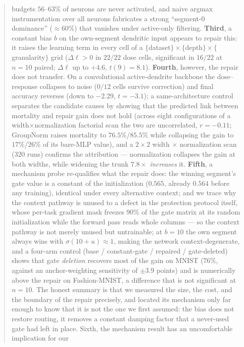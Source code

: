 \documentclass[review,12pt,number]{elsarticle}
\begin{document}
\begin{frontmatter}
\begin{abstract}
budgets $56$--$63\%$ of neurons are never activated, and naive argmax
instrumentation over all neurons fabricates a strong ``segment-0 dominance''
($\approx 60\%$) that vanishes under active-only filtering.
\textbf{Third}, a constant bias $b$ on the own-segment dendritic input appears
to repair this: it raises the learning term in every cell of a
$\{$dataset$\}\times\{$depth$\}\times\{$granularity$\}$ grid
($\Delta\ell>0$ in $22/22$ dose cells, significant in $16/22$ at $n{=}10$
paired; $\Delta\ell$ up to $+4.6$, $t(9){=}8.1$). \textbf{Fourth}, however, the
repair does not transfer. On a convolutional active-dendrite backbone the
dose--response collapses to noise ($0/12$ cells survive correction) and final accuracy
reverses (down to $-2.29$, $t{=}-3.1$); a same-architecture control separates
the candidate causes by showing that the predicted link between mortality and repair gain does not hold
(across eight configurations of a width$\times$normalization factorial scan the two are
uncorrelated, $r=-0.11$; GroupNorm raises mortality to $76.5\%$/$85.5\%$ while collapsing the gain to
$17\%$/$26\%$ of its bare-MLP value), and a $2\times 2$ width $\times$
normalization scan ($320$ runs) confirms the attribution --- normalization
collapses the gain at both widths, while widening the trunk $7.8\times$
\emph{increases} it. \textbf{Fifth}, a mechanism probe re-qualifies what the
repair does: the winning segment's gate value is a constant of the
initialization ($0.565$, already $0.564$ before any training), identical under
every alternative context; and we trace why the context pathway is unused to a
defect in the protection protocol itself, whose per-task gradient mask freezes
$90\%$ of the gate matrix at its random initialization while the forward pass
reads whole columns --- so the context pathway is not merely unused but
untrainable; at $b{=}10$ the own segment always wins with
$\sigma(10+u)\approx 1$, making the network context-degenerate, and a
four-arm control (base / constant-gate / repaired / gate-deleted) shows that
gate \emph{deletion} recovers most of the gain on MNIST ($76\%$, against an
anchor-weighting sensitivity of $\pm3.9$ points) and is numerically above the
repair on Fashion-MNIST, a difference that is not significant at $n{=}10$. The honest summary is that we measured the size, the cost, and
the boundary of the repair precisely, and located its mechanism only far enough
to know that it is not the one we first assumed: the bias does not restore
routing, it removes a constant damping factor that a never-used gate had left
in place. Sixth, the mechanism result has an uncomfortable implication for our

\end{abstract}
\end{frontmatter}
\end{document}

